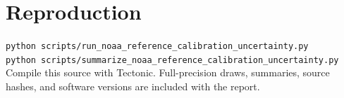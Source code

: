 \documentclass[10pt,a4paper]{article}
\begin{document}
\section*{Reproduction}
\texttt{python scripts/run\_noaa\_reference\_calibration\_uncertainty.py}\\
\texttt{python scripts/summarize\_noaa\_reference\_calibration\_uncertainty.py}\\
Compile this source with Tectonic. Full-precision draws, summaries, source hashes, and software versions are included with the report.
\end{document}
